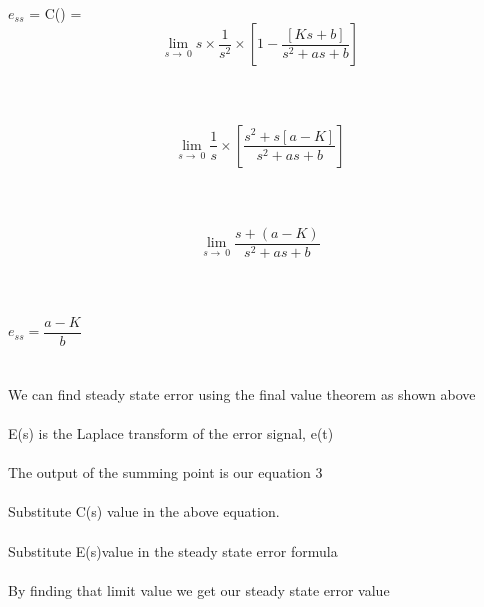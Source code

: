 \documentclass{beamer}
\begin{document}
\\$e_{ss}$ = C(\infty) = $$\lim_{s\to\ 0} s\times\dfrac{1}{s^2}\times[1-\dfrac{[Ks+b]}{s^2+as+b}]$$
\\
\\
\\ \implies$$\lim_{s\to\ 0} \dfrac{1}{s}\times[\dfrac{s^2+s[a-K]}{s^2+as+b}]$$
\\
\\
\\ \implies$$\lim_{s\to\ 0}\dfrac{s+(a-K)}{s^2+as+b}$$
\\
\\
\\ \implies $e_{ss}=\dfrac{a-K}{b}$
\\

\\
\\ We can find steady state error using the final value theorem as shown above
\\
\\E(s) is the Laplace transform of the error signal, e(t)
\\
\\The output of the summing point is our equation 3
\\
\\Substitute C(s) value in the above equation.
\\
\\Substitute E(s)value in the steady state error formula
\\
\\By finding that limit value we get our steady state error value 
\end{document}
